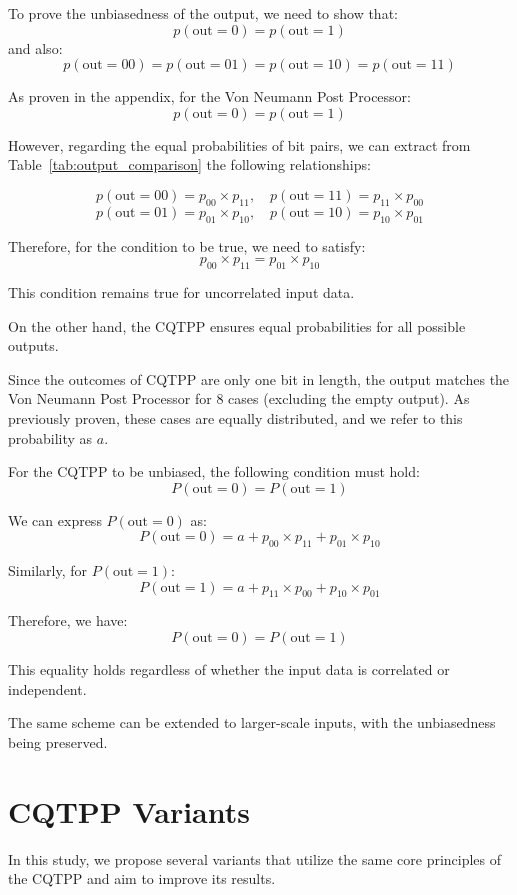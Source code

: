 To prove the unbiasedness of the output, we need to show that:
\[
p(\text{out} = 0) = p(\text{out} = 1)
\]
and also:
\[
p(\text{out} = 00) = p(\text{out} = 01) = p(\text{out} = 10) = p(\text{out} = 11)
\]

\noindent As proven in the appendix, for the Von Neumann Post Processor:
\[
p(\text{out} = 0) = p(\text{out} = 1)
\]

However, regarding the equal probabilities of bit pairs, we can extract from Table~\ref{tab:output_comparison} the following relationships:

\[
p(\text{out} = 00) = p_{00} \times p_{11}, \quad p(\text{out} = 11) = p_{11} \times p_{00}
\]
\[
p(\text{out} = 01) = p_{01} \times p_{10}, \quad p(\text{out} = 10) = p_{10} \times p_{01}
\]

\noindent Therefore, for the condition to be true, we need to satisfy:
\[
p_{00} \times p_{11} = p_{01} \times p_{10}
\]

\noindent This condition remains true for uncorrelated input data.

\noindent On the other hand, the CQTPP ensures equal probabilities for all possible outputs.

Since the outcomes of CQTPP are only one bit in length, the output matches the Von Neumann Post Processor for 8 cases (excluding the empty output). As previously proven, these cases are equally distributed, and we refer to this probability as \(a\).

For the CQTPP to be unbiased, the following condition must hold:
\[
P(\text{out} = 0) = P(\text{out} = 1)
\]

We can express \(P(\text{out} = 0)\) as:
\[
P(\text{out} = 0) = a + p_{00} \times p_{11} + p_{01} \times p_{10}
\]

Similarly, for \(P(\text{out} = 1)\):
\[
P(\text{out} = 1) = a + p_{11} \times p_{00} + p_{10} \times p_{01}
\]

Therefore, we have:
\[
P(\text{out} = 0) = P(\text{out} = 1)
\]

This equality holds regardless of whether the input data is correlated or independent.

\noindent The same scheme can be extended to larger-scale inputs, with the unbiasedness being preserved.

\section{CQTPP Variants}
In this study, we propose several variants that utilize the same core principles of the CQTPP and aim to improve its results.

